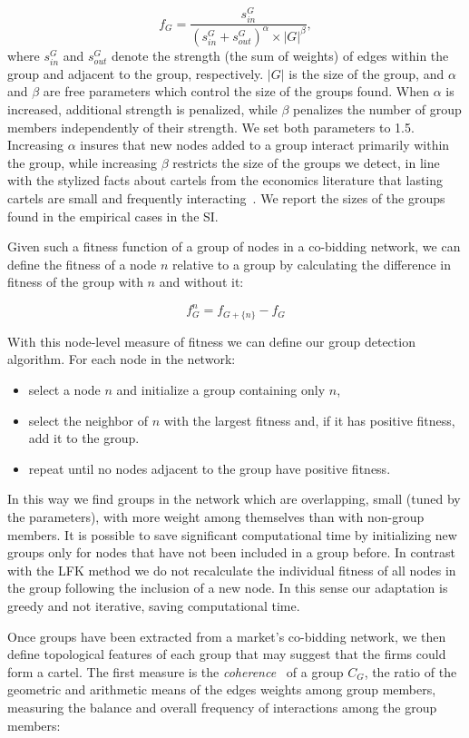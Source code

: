 $$f_{G}= \dfrac{s_{in}^{G}}
{\left(s_{in}^{G}+s_{out}^{G}\right)^{\alpha}
\times \lvert G \rvert^{\beta}},$$
where $s_{in}^{G}$ and $s_{out}^{G}$ denote the strength (the sum of weights) of edges within the group and adjacent to the group, respectively. $\lvert G \rvert$ is the size of the group, and $\alpha$ and $\beta$ are free parameters which control the size of the groups found. When $\alpha$ is increased, additional strength is penalized, while $\beta$ penalizes the number of group members independently of their strength. We set both parameters to 1.5. Increasing $\alpha$ insures that new nodes added to a group interact primarily within the group, while increasing $\beta$ restricts the size of the groups we detect, in line with the stylized facts about cartels from the economics literature that lasting cartels are small and frequently interacting~\cite{levenstein2006determines}. We report the sizes of the groups found in the empirical cases in the SI.

Given such a fitness function of a group of nodes in a co-bidding network, we can define the fitness of a node $n$ relative to a group by calculating the difference in fitness of the group with $n$ and without it:

$$f_{G}^{n}= f_{G+\{ n \}} - f_{G}$$

With this node-level measure of fitness we can define our group detection algorithm. For each node in the network:
\begin{itemize}
    \item select a node $n$ and initialize a group containing only $n$,
    \item select the neighbor of $n$ with the largest fitness and, if it has positive fitness, add it to the group. 
    \item repeat until no nodes adjacent to the group have positive fitness. 
\end{itemize}
In this way we find groups in the network which are overlapping, small (tuned by the parameters), with more weight among themselves than with non-group members. It is possible to save significant computational time by initializing new groups only for nodes that have not been included in a group before. In contrast with the LFK method we do not recalculate the individual fitness of all nodes in the group following the inclusion of a new node. In this sense our adaptation is greedy and not iterative, saving computational time.

Once groups have been extracted from a market's co-bidding network, we then define topological features of each group that may suggest that the firms could form a cartel. The first measure is the \textit{coherence}~\cite{onnela2005intensity} of a group $C_{G}$, the ratio of the geometric and arithmetic means of the edges weights among group members, measuring the balance and overall frequency of interactions among the group members:

